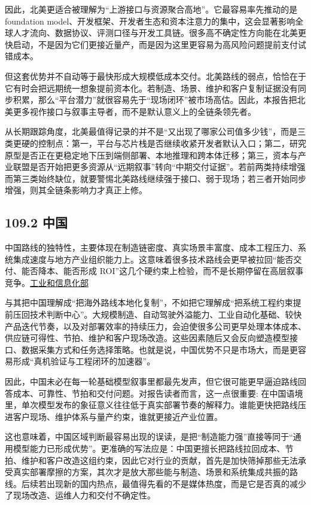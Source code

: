 因此，北美更适合被理解为“上游接口与资源聚合高地”。它最容易率先推动的是 foundation model、开发框架、开发者生态和资本注意力的集中，这会显著影响全球人才流向、数据协议、评测口径与开发工具链。很多高不确定性方向能在北美更快启动，不是因为它们更接近量产，而是因为这里更容易为高风险问题提前支付试错成本。

但这套优势并不自动等于最快形成大规模低成本交付。北美路线的弱点，恰恰在于它有时会把远期统一想象提前资本化。若制造、场景、维护和客户复制证据没有同步积累，那么“平台潜力”就很容易先于“现场闭环”被市场高估。因此，本报告把北美更多视作接口与叙事主导者，而不是默认意义上的全链条领先者。

从长期跟踪角度，北美最值得记录的并不是“又出现了哪家公司值多少钱”，而是三类更硬的控制点：第一，平台与芯片栈是否继续收紧开发者默认入口；第二，研究原型是否正在更稳定地下压到端侧部署、本地推理和跨本体迁移；第三，资本与产业联盟是否开始把更多资源从“远期叙事”转向“中期交付证据”。若前两类持续增强而第三类始终缺位，就要警惕北美路线继续强于接口、弱于现场；若三者开始同步增强，则其全链条影响力才真正上修。

\subsection*{109.2 中国}


中国路线的独特性，主要体现在制造链密度、真实场景丰富度、成本工程压力、系统集成速度与地方产业组织能力上。这意味着很多技术路线会更早被拉回“能否交付、能否降本、能否形成 ROI”这几个硬约束上检验，而不是长期停留在高层叙事竞争。\href{https://www.miit.gov.cn/}{工业和信息化部}

与其把中国理解成“把海外路线本地化复制”，不如把它理解成“把系统工程约束提前压回技术判断中心”。大规模制造、自动驾驶外溢能力、工业自动化基础、较快产品迭代节奏，以及对部署效率的持续压力，会迫使很多公司更早处理本体成本、供应链可得性、节拍、维护和客户现场改造。这些因素随后又会反向塑造模型接口、数据采集方式和任务选择策略。也就是说，中国优势不只是市场大，而是更容易形成“真机验证与工程闭环的加速器”。

因此，中国未必在每一轮基础模型叙事里都最先发声，但它很可能更早逼迫路线回答成本、可靠性、节拍和交付问题。对报告读者而言，这一点很重要: 在中国语境里，单次模型发布的象征意义往往低于真实部署节奏的解释力。谁能更快把路线压进客户现场、维护体系与量产约束，谁就更接近产业位置。

这也意味着，中国区域判断最容易出现的误读，是把“制造能力强”直接等同于“通用模型能力已形成优势”。更准确的写法应是：中国更擅长把路线拉回成本、节拍、维护和客户改造这组约束，因此它对行业的贡献，首先是加快筛掉那些无法承受真实部署摩擦的方案，其次才是放大那些能与制造、场景和系统集成共振的路线。后续若出现新的国内热点，最值得先看的不是媒体热度，而是它是否真的减少了现场改造、运维人力和交付不确定性。

